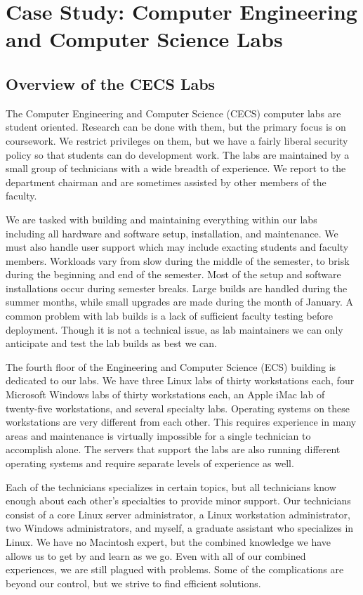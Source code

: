 \chapter{Case Study:  Computer Engineering and Computer Science Labs} \label{ch:introduction_case_study}
\section{Overview of the CECS Labs}

The Computer Engineering and Computer Science (CECS) computer labs are student oriented.  Research can be done with them, but the primary focus is on coursework.  We restrict privileges on them, but we have a fairly liberal security policy so that students can do development work.  The labs are maintained by a small group of technicians with a wide breadth of experience.  We report to the department chairman and are sometimes assisted by other members of the faculty. 

We are tasked with building and maintaining everything within our labs including all hardware and software setup, installation, and maintenance.  We must also handle user support which may include exacting students and faculty members.  Workloads vary from slow during the middle of the semester, to brisk during the beginning and end of the semester.  Most of the setup and software installations occur during semester breaks.  Large builds are handled during the summer months, while small upgrades are made during the month of January.  A common problem with lab builds is a lack of sufficient faculty testing before deployment.  Though it is not a technical issue, as lab maintainers we can only anticipate and test the lab builds as best we can. 

The fourth floor of the Engineering and Computer Science (ECS) building is dedicated to our labs.  We have three Linux labs of thirty workstations each, four Microsoft Windows labs of thirty workstations each, an Apple iMac lab of twenty-five workstations, and several specialty labs.  Operating systems on these workstations are very different from each other.  This requires experience in many areas and maintenance is virtually impossible for a single technician to accomplish alone.  The servers that support the labs are also running different operating systems and require separate levels of experience as well.

Each of the technicians specializes in certain topics, but all technicians know enough about each other’s specialties to provide minor support.  Our technicians consist of a core Linux server administrator, a Linux workstation administrator, two Windows administrators, and myself, a graduate assistant who specializes in Linux.  We have no Macintosh expert, but the combined knowledge we have allows us to get by and learn as we go.  Even with all of our combined experiences, we are still plagued with problems.  Some of the complications are beyond our control, but we strive to find efficient solutions. 

